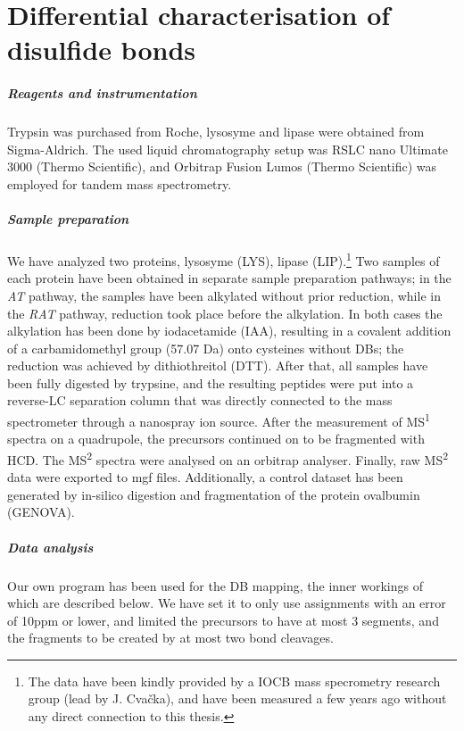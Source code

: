 \chapter{Differential characterisation of disulfide bonds}\label{chap:methods}

\paragraph{Reagents and instrumentation} Trypsin was purchased from Roche, lyso\-syme and lipase were obtained from Sigma-Aldrich. The used liquid chromatography setup was RSLC nano Ultimate 3000 (Thermo Scientific), and Orbitrap Fusion Lumos (Thermo Scientific) was employed for tandem mass spectrometry.

\paragraph{Sample preparation} We have analyzed two proteins, lysosyme (LYS), lipase (LIP).\footnote{The data have been kindly provided by a IOCB mass specrometry research group (lead by J. Cvačka), and have been measured a few years ago without any direct connection to this thesis.} Two samples of each protein have been obtained in separate sample preparation pathways; in the \emph{AT} pathway, the samples have been alkylated without prior reduction, while in the \emph{RAT} pathway, reduction took place before the alkylation. In both cases the alkylation has been done by iodacetamide (IAA), resulting in a covalent addition of a carbamidomethyl group (57.07 Da) onto cysteines without DBs; the reduction was achieved by dithiothreitol (DTT). After that, all samples have been fully digested by trypsine, and the resulting peptides were put into a reverse-LC separation column that was directly connected to the mass spectrometer through a nanospray ion source. After the measurement of MS\textsuperscript{1} spectra on a quadrupole, the precursors continued on to be fragmented with HCD\@. The MS\textsuperscript{2} spectra were analysed on an orbitrap analyser. Finally, raw MS\textsuperscript{2} data were exported to mgf files. Additionally, a control dataset has been generated by in-silico digestion and fragmentation of the protein ovalbumin (GENOVA).

\paragraph{Data analysis} Our own program has been used for the DB mapping, the inner workings of which are described below. We have set it to only use assignments with an error of 10ppm or lower, and limited the precursors to have at most 3 segments, and the fragments to be created by at most two bond cleavages.

